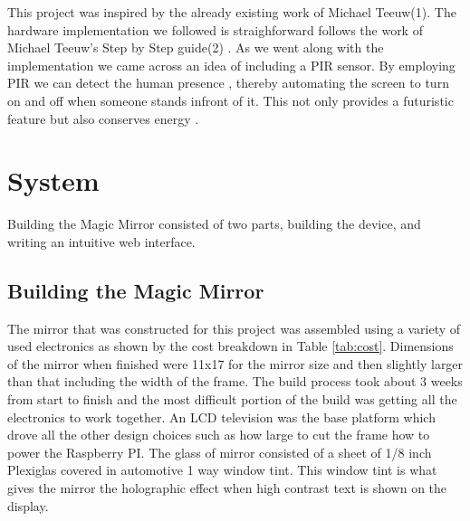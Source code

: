 \documentclass[conference]{IEEEtran}
\begin{document}
This project was inspired by the already existing work of Michael Teeuw(1). The hardware implementation we followed is straighforward follows the work of Michael Teeuw's Step by Step guide(2) . As we went along with the implementation we came across an idea of including a PIR sensor. By employing PIR we can detect the human presence , thereby automating the screen to turn on and off when someone stands infront of it. This not only provides a futuristic feature but also conserves energy . 


\section{System} 
Building the Magic Mirror consisted of two parts, building the device, and writing an intuitive web interface.
\subsection{Building the Magic Mirror}
The mirror that was constructed for this project was assembled using a variety of used electronics as shown by the cost breakdown in Table \ref{tab:cost}.
Dimensions of the mirror when finished were 11x17 for the mirror size and then slightly larger than that including the width of the frame.
The build process took about 3 weeks from start to finish and the most difficult portion of the build was getting all the electronics to work together.
An LCD television was the base platform which drove all the other design choices such as how large to cut the frame how to power the Raspberry PI.
The glass of mirror consisted of a sheet of 1/8 inch Plexiglas covered in automotive 1 way window tint.
This window tint is what gives the mirror the holographic effect when high contrast text is shown on the display.
\end{document}
